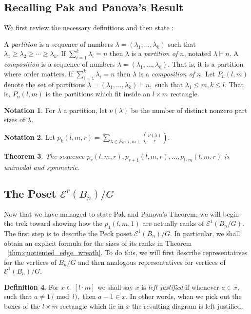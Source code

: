 \documentclass[10 pt]{amsart}
\theoremstyle{plain}
\newtheorem{thm}{Theorem}[section]
\theoremstyle{definition}
\newtheorem{defn}[thm]{Definition}
\newtheorem{note}[thm]{Notation}
\theoremstyle{remark}
\numberwithin{equation}{section}
\newcommand\ssec{\subsection}
\begin{document}
\ssec{Recalling Pak and Panova's Result}
We first review the necessary definitions and then state \cite[Theorem 1.1]{pak}:

A {\it partition} is a sequence of numbers $\lambda = (\lambda_1,\ldots, \lambda_k)$ such that $\lambda_1 \geq \lambda_2 \geq \cdots \geq \lambda_k.$ If $\sum_{i=1}^k \lambda_i = n$ then $\lambda$ is a {\it partition of $n$}, notated $\lambda \vdash n.$ A {\it composition} is a sequence of numbers $\lambda = (\lambda_1,\ldots, \lambda_k).$ That is, it is a partition where order matters. If $\sum_{i=1}^k \lambda_i = n$ then $\lambda$ is a {\it composition of $n$}. Let $P_n(l,m)$ denote the set of partitions $\lambda = (\lambda_1,\ldots, \lambda_k) \vdash n,$ such that $\lambda_1 \leq m,k \leq l.$ That is, $P_n(l,m)$ is the partitions which fit inside an $l \times m$ rectangle.

\begin{note}
\cite[Section 1]{pak} For $\lambda$ a partition, let $\nu(\lambda)$ be the number of distinct nonzero part sizes of $\lambda.$
\end{note}

\begin{note}
\cite[Section 1]{pak}
Let $p_k(l,m,r) = \sum_{\lambda \in P_k(l,m)} \binom{\nu(\lambda)}{r}.$
\end{note}

\begin{thm}
\label{thm:pak_thm}
\cite[Theorem 1.1]{pak}
The sequence $p_r(l,m,r), p_{r+1}(l,m,r),\ldots, p_{l\cdot m}(l,m,r)$ is unimodal and symmetric.
\end{thm}

\ssec{The Poset $\mathcal E^r(B_n)/G$}
Now that we have managed to state Pak and Panova's Theorem, we will begin the trek toward showing how the $p_1(l,m,1)$ are actually ranks of $\mathcal E^1(B_n/G).$ The first step is to describe the Peck poset $\mathcal E^1(B_n)/G.$ In particular, we shall obtain an explicit formula for the sizes of its ranks in Theorem ~\ref{thm:quotiented_edge_wreath}. To do this, we will first describe representatives for the vertices of $B_n/G$ and then analogous representatives for vertices of $\mathcal E^1(B_n)/G.$

\begin{defn}
For $x \subset [l \cdot m]$ we shall say $x$ is {\it left justified} if whenever $a \in x,$ such that $a \neq 1 \pmod l,$ then $a -1 \in x.$ In other words, when we pick out the boxes of the $l\times m$ rectangle which lie in $x$ the resulting diagram is left justified.
\end{defn}
\end{document}
